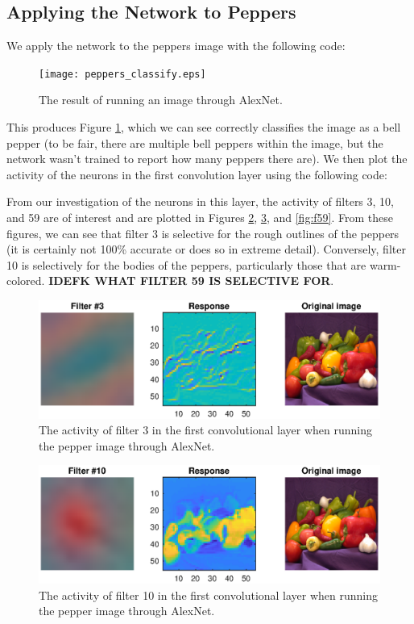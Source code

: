 \documentclass[11pt, oneside]{article}
\begin{document}
\subsection{Applying the Network to Peppers}

We apply the network to the peppers image with the following code:


\begin{figure}[ht!]
\texttt{[image: peppers\_classify.eps]}
\caption{The result of running an image through AlexNet.}
\label{fig:pepClassified}
\end{figure}

This produces Figure \ref{fig:pepClassified}, which we can see correctly classifies the image as a bell pepper (to be fair, there are multiple bell peppers within the image, but the network wasn't trained to report how many peppers there are). We then plot the activity of the neurons in the first convolution layer using the following code:


From our investigation of the neurons in this layer, the activity of filters 3, 10, and 59 are of interest and are plotted in Figures \ref{fig:f3}, \ref{fig:f10}, and \ref{fig:f59}. From these figures, we can see that filter 3 is selective for the rough outlines of the peppers (it is certainly not 100\% accurate or does so in extreme detail). Conversely, filter 10 is selectively for the bodies of the peppers, particularly those that are warm-colored. \textbf{IDEFK WHAT FILTER 59 IS SELECTIVE FOR}.

\begin{figure}[ht!]
\includegraphics[width=1\textwidth]{filter3.eps}
\caption{The activity of filter 3 in the first convolutional layer when running the pepper image through AlexNet.}
\label{fig:f3}
\end{figure}

\begin{figure}[ht!]
\includegraphics[width=1\textwidth]{filter10.eps}
\caption{The activity of filter 10 in the first convolutional layer when running the pepper image through AlexNet.}
\label{fig:f10}
\end{figure}
\end{document}
